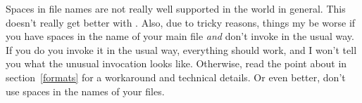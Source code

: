 \documentclass{lltxdoc}
\begin{document}
 Spaces in file names are not really well supported in the \tex
world in general. This doesn't really get better with \luatex. Also, due to
tricky reasons, things my be worse if you have spaces in the name of your main
\tex file \emph{and} don't invoke \luatex in the usual way. If you do you
invoke it in the usual way, everything should work, and I won't tell you what
the unusual invocation looks like. Otherwise, read the point about
 in section~\ref{formats} for a workaround and technical
details. Or even better, don't use spaces in the names of your \tex files.
\end{document}
